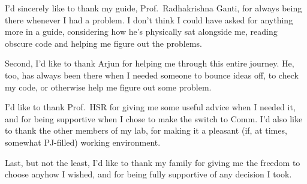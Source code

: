 \acknowledgements

I'd sincerely like to thank my guide, Prof.\ Radhakrishna Ganti, for always
being there whenever I had a problem. I don't think I could have asked for
anything more in a guide, considering how he's physically sat alongside me,
reading obscure code and helping me figure out the problems.

Second, I'd like to thank Arjun for helping me through this entire journey. He,
too, has always been there when I needed someone to bounce ideas off, to check
my code, or otherwise help me figure out some problem.

I'd like to thank Prof.\ HSR for giving me some useful advice when I needed it,
and for being supportive when I chose to make the switch to Comm. I'd also like
to thank the other members of my lab, for making it a pleasant (if, at times,
somewhat PJ-filled) working environment.

Last, but not the least, I'd like to thank my family for giving me the freedom
to choose anyhow I wished, and for being fully supportive of any decision I
took.
